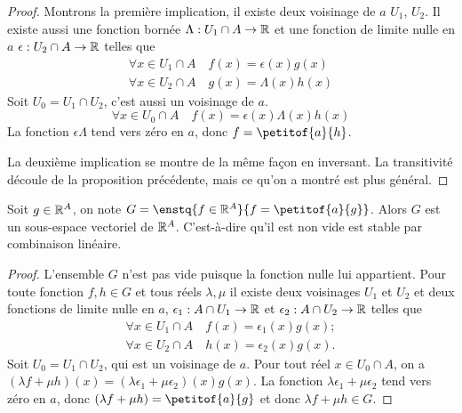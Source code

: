 \begin{proof}
  Montrons la première implication, il existe deux voisinage de $a$ $U_1$, $U_2$. Il existe aussi une fonction bornée $\Lambda : U_1\cap A \rightarrow \mathbb{R}$ et une fonction de limite nulle en $a$ $\epsilon : U_2\cap A \rightarrow \mathbb{R}$ telles que
  \begin{align}
    \forall x \in U_1 \cap A \quad f(x)=\epsilon(x)g(x)\\
    \forall x \in U_2 \cap A \quad g(x)=\Lambda(x) h(x)
  \end{align}
Soit $U_0=U_1\cap U_2$, c'est aussi un voisinage de $a$.
\begin{equation}
  \forall x \in U_0 \cap A \quad f(x)=\epsilon(x) \Lambda(x) h(x)
\end{equation}
La fonction $\epsilon \Lambda$ tend vers zéro en $a$, donc $f=\petitof{a}{h}$.

La deuxième implication se montre de la même façon en inversant. La transitivité découle de la proposition précédente, mais ce qu'on a montré est plus général.
\end{proof}

\begin{prop}
  Soit $g \in \mathbb{R}^A$, on note $G=\enstq{f \in \R^A}{f=\petitof{a}{g}}$. Alors $G$ est un sous-espace vectoriel de $\mathbb{R}^A$. C'est-à-dire qu'il est non vide est stable par combinaison linéaire.
\end{prop}
\begin{proof}
  L'ensemble $G$ n'est pas vide puisque la fonction nulle lui appartient. Pour toute fonction $f,h \in G$ et tous réels $\lambda, \mu$ il existe deux voisinages $U_1$ et $U_2$ et deux fonctions de limite nulle en $a$, $\epsilon_1 : A \cap U_1 \rightarrow \mathbb{R}$ et $\epsilon_2 : A \cap U_2 \rightarrow \mathbb{R}$ telles que
  \begin{align}
    \forall x \in U_1 \cap A \quad f(x)=\epsilon_1(x)g(x);\\
    \forall x \in U_2 \cap A \quad h(x)=\epsilon_2(x)g(x).
  \end{align}
Soit $U_0=U_1\cap U_2$, qui est un voisinage de $a$. Pour tout réel $x \in U_0 \cap A$, on a $(\lambda f+\mu h)(x)=(\lambda\epsilon_1+\mu\epsilon_2)(x)g(x)$. La fonction $\lambda\epsilon_1+\mu\epsilon_2$ tend vers zéro en $a$, donc $(\lambda f+\mu h)=\petitof{a}{g}$ et donc $\lambda f+\mu h \in G$.
\end{proof}

